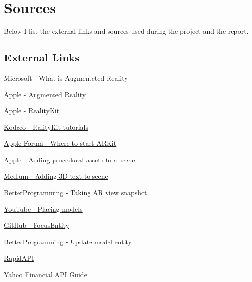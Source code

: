 \documentclass[11pt,a4paper,oneside]{report}
\begin{document}
\chapter{Sources}

Below I list the external links and sources used during the project and the report.

% 

\section{External Links}

\hyperlink{https://dynamics.microsoft.com/en-us/mixed-reality/guides/what-is-augmented-reality-ar/}{Microsoft - What is Augmenteted Reality}

\hyperlink{https://developer.apple.com/augmented-reality/}{Apple - Augmented Reality}

\hyperlink{https://developer.apple.com/documentation/realitykit/}{Apple - RealityKit}

\hyperlink{https://www.kodeco.com/books/apple-augmented-reality-by-tutorials/v1.0/chapters/iii-introduction}{Kodeco - RalityKit tutorials}

\hyperlink{https://developer.apple.com/forums/thread/658300}{Apple Forum - Where to start ARKit}

\hyperlink{https://developer.apple.com/documentation/realitykit/adding-procedural-assets-to-a-scene}{Apple - Adding procedural assets to a scene}

\hyperlink{https://coledennis.medium.com/tutorial-generating-3d-text-with-realitykit-in-a-swiftui-app-fa2a50403012}{Medium - Adding 3D text to scene}

\hyperlink{https://betterprogramming.pub/take-an-arview-snapshot-in-realitykit-93b620cf99b3}{BetterProgramming - Taking AR view snapshot}

\hyperlink{https://www.youtube.com/watch?v=9R_G0EI-UoI}{YouTube - Placing models}

\hyperlink{https://github.com/maxxfrazer/FocusEntity}{GitHub - FocusEntity}

\hyperlink{https://betterprogramming.pub/how-to-add-text-to-an-arview-in-an-ios-application-tutorial-f3f746f4dc1f}{BetterProgramming - Update model entity}

\hyperlink{https://rapidapi.com/apidojo/api/yahoo-finance1}{RapidAPI}

\hyperlink{https://algotrading101.com/learn/yahoo-finance-api-guide/}{Yahoo Financial API Guide}
\end{document}
